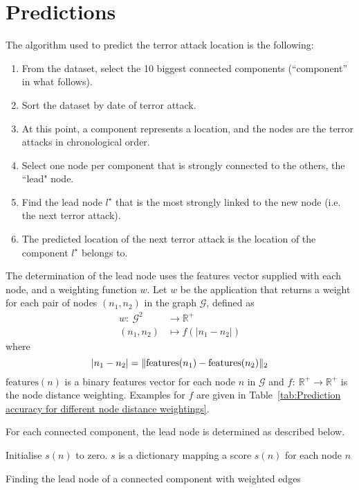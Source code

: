 \section{Predictions}
\label{sec:Predictions}
The algorithm used to predict the terror attack location is the following:
\begin{enumerate}
\item From the dataset, select the 10 biggest connected components (``component'' in what follows).
\item Sort the dataset by date of terror attack.
\item At this point, a component represents a location, and the nodes are the terror attacks in chronological order.
\item Select one node per component that is strongly connected to the others, the ``lead" node.
\item Find the lead node $l^\star$ that is the most strongly linked to the new node (i.e. the next terror attack).
\item The predicted location of the next terror attack is the location of the component $l^\star$ belongs to.
\end{enumerate}

The determination of the lead node uses the features vector supplied with each node, and a weighting function $w$.
Let $w$ be the application that returns a weight for each pair of nodes $(n_1,n_2)$ in the graph $\mathcal{G}$, defined as
\begin{align}
w:~ \mathcal{G}^2	& \to \mathbb{R}^+ \\
(n_1,n_2) 			& \mapsto f(|n_1-n_2|)
\end{align}
where
\begin{equation}
|n_1-n_2| = \| \text{features}(n_1)-\text{features}(n_2)\|_2 \\
\end{equation}
$\text{features}(n)$ is a binary features vector for each node $n\text{ in }\mathcal{G}$ and $f:~\mathbb{R}^+ \to  \mathbb{R}^+$ is the node distance weighting.
Examples for $f$ are given in Table~\ref{tab:Prediction accuracy for different node distance weightings}.

For each connected component, the lead node is determined as described below.

\begin{algorithm}[H]
\vspace{-.5em}

 
 
 Initialise $s(n)$ to zero. $s$ is a dictionary mapping a score $s(n)$ for each node $n$
 
 \label{alg:leadNode}
 \caption{Finding the lead node of a connected component with weighted edges}
\end{algorithm}

